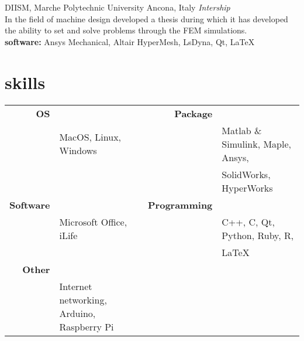\documentclass[]{friggeri-cv} %
\begin{document}
\begin{entrylist}
      
    {DIISM, Marche Polytechnic University}
    {Ancona, Italy}
    {\emph{Intership}\\
    In the field of machine design developed a thesis during which it
    has developed the ability to set and solve problems through the FEM simulations.\\
    \textbf{software: } Ansys Mechanical, Altair  HyperMesh, LsDyna, Qt, \LaTeX \quad
    \href{https://github.com/frank1789/LsDynaToAPDL}{\faGithub}
    }
      
    
  \end{entrylist}

\pagebreak
\section{skills}

\begin{tabular}{rlrl}
\textbf{OS} && \textbf{Package}\\
& MacOS, Linux, Windows  &&  Matlab \& Simulink, Maple, Ansys,\\ &&& SolidWorks, HyperWorks \\
\textbf{Software} && \textbf{Programming}\\
&Microsoft Office, iLife &&  C++,  C, Qt, Python, Ruby, R, \\ &&&\LaTeX{} \\
\textbf{Other}\\
&Internet networking, Arduino, Raspberry Pi\\
\end{tabular}\\


%
%
%
%
\end{document}
